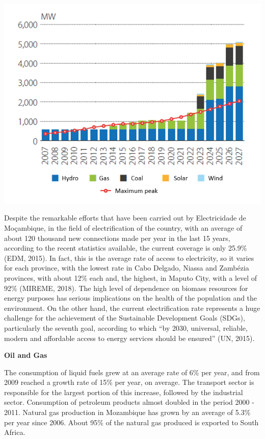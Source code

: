\documentclass[
]{book}
\begin{document}
\includegraphics{Figure40.png}

Despite the remarkable efforts that have been carried out by Electricidade de Moçambique, in the field of electrification of the country, with an average of about 120 thousand new connections made per year in the last 15 years, according to the recent statistics available, the current coverage is only 25.9\% (EDM, 2015). In fact, this is the average rate of access to electricity, so it varies for each province, with the lowest rate in Cabo Delgado, Niassa and Zambézia provinces, with about 12\% each and, the highest, in Maputo City, with a level of 92\% (MIREME, 2018). The high level of dependence on biomass resources for energy purposes has serious implications on the health of the population and the environment. On the other hand, the current electrification rate represents a huge challenge for the achievement of the Sustainable Development Goals (SDGs), particularly the seventh goal, according to which ``by 2030, universal, reliable, modern and affordable access to energy services should be ensured'' (UN, 2015).

\textbf{Oil and Gas}

The consumption of liquid fuels grew at an average rate of 6\% per year, and from 2009 reached a growth rate of 15\% per year, on average. The transport sector is responsible for the largest portion of this increase, followed by the industrial sector. Consumption of petroleum products almost doubled in the period 2000 - 2011. Natural gas production in Mozambique has grown by an average of 5.3\% per year since 2006. About 95\% of the natural gas produced is exported to South Africa.
\end{document}
